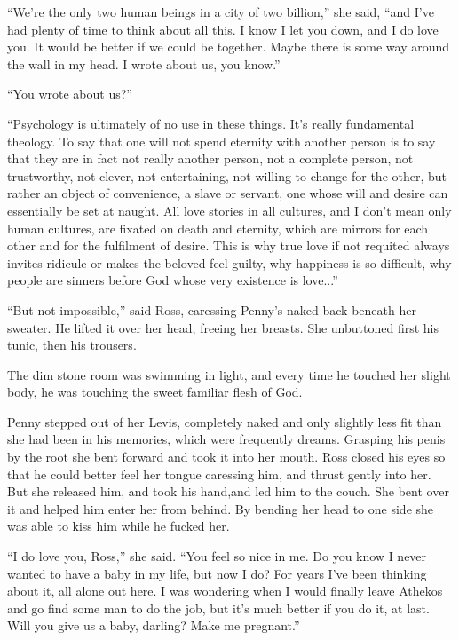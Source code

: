 \documentclass[english,11pt,letterpaper,onecolumn]{scrbook}
\begin{document}
	``We're the only two human beings in a city of two billion,'' she said, ``and I've had plenty of time to think about all this.  I know I let you down, and I do love you.  It would be better if we could be together.  Maybe there is some way around the wall in my head.  I wrote about us, you know.''

	``You wrote about us?''

	``Psychology is ultimately of no use in these things.  It's really fundamental theology.  To say that one will not spend eternity with another person is to say that they are in fact not really another person, not a complete person, not trustworthy, not clever, not entertaining, not willing to change for the other, but rather an object of convenience, a slave or servant, one whose will and desire can essentially be set at naught.  All love stories in all cultures, and I don't mean only human cultures, are fixated on death and eternity, which are mirrors for each other and for the fulfilment of desire.  This is why true love if not requited always invites ridicule or makes the beloved feel guilty, why happiness is so difficult, why people are sinners before God whose very existence is love...''

	``But not impossible,'' said Ross, caressing Penny's naked back beneath her sweater.  He lifted it over her head, freeing her breasts.  She unbuttoned first his tunic, then his trousers.

	The dim stone room was swimming in light, and every time he touched her slight body, he was touching the sweet familiar flesh of God.

	Penny stepped out of her Levis, completely naked and only slightly less fit than she had been in his memories, which were frequently dreams.   Grasping his penis by the root she bent forward and took it into her mouth.  Ross closed his eyes so that he could better feel her tongue caressing him, and thrust gently into her.  But she released him, and took his hand,and led him to the couch.  She bent over it and helped him enter her from behind.  By bending her head to one side she was able to kiss him while he fucked her.

	``I do love you, Ross,'' she said.  ``You feel so nice in me.  Do you know I never wanted to have a baby in my life, but now I do?  For years I've been thinking about it, all alone out here.  I was wondering when I would finally leave Athekos and go find some man to do the job, but it's much better if you do it, at last.  Will you give us a baby, darling?  Make me pregnant.''
\end{document}
